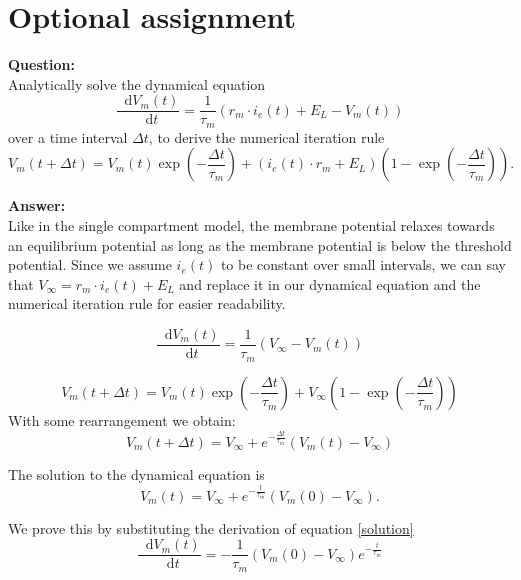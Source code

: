 \documentclass{scrartcl}
\newcommand*\diff{\mathop{}\!\mathrm{d}}
\newcommand\Question{%
  \textbf{Question:}%
}
\newcommand\Answer{%
  \textbf{Answer:}%
}
\begin{document}
\section{Optional assignment}

\Question\\
Analytically solve the dynamical equation 
\begin{equation*}
\frac{\diff V_m(t)}{\diff t} = \frac{1}{\tau_m}\left( r_m \cdot i_e(t) + E_L - V_m(t)\right)
\end{equation*}
over a time interval $\Delta t$, to derive the numerical iteration rule
\begin{equation*}
V_m(t+\Delta t) = V_m(t) \exp\left(-\frac{\Delta t}{\tau_m}\right) + \left(i_e(t) \cdot r_m + E_L \right) \left( 1 - \exp{\left( -\frac{\Delta t}{\tau_m}\right)}\right).
\end{equation*}

\Answer\\
Like in the single compartment model, the membrane potential relaxes towards an equilibrium potential as long as the membrane potential is below the threshold potential. Since we assume $i_e(t)$ to be constant over small intervals, we can say that $V_\infty = r_m \cdot i_e(t) + E_L$ and replace it in our dynamical equation and the numerical iteration rule for easier readability.

\begin{equation}
\frac{\diff V_m(t)}{\diff t} = \frac{1}{\tau_m}\left( V_\infty - V_m(t)\right)
\label{dynamic}
\end{equation}

\begin{equation*}
V_m(t+\Delta t) = V_m(t) \exp\left(-\frac{\Delta t}{\tau_m}\right) + V_\infty \left( 1 - \exp{\left( -\frac{\Delta t}{\tau_m}\right)}\right)
\end{equation*}
With some rearrangement we obtain:
\begin{equation}
V_m(t+\Delta t)= V_\infty + e^{-\frac{\Delta t}{\tau_m}}\left( V_m(t) -V_\infty\right)
\label{numeric}
\end{equation}

The solution to the dynamical equation is 
\begin{equation}
V_m(t) = V_\infty + e^{-\frac{t}{\tau_m}}(V_m(0) - V_\infty).
\label{solution}
\end{equation}


We prove this by substituting the derivation of equation \ref{solution} 
\begin{equation}
\frac{\diff V_m(t)}{\diff t} = -\frac{1}{\tau_m}(V_m(0) - V_\infty) e^{-\frac{t}{\tau_m}}
\end{equation}
\end{document}
